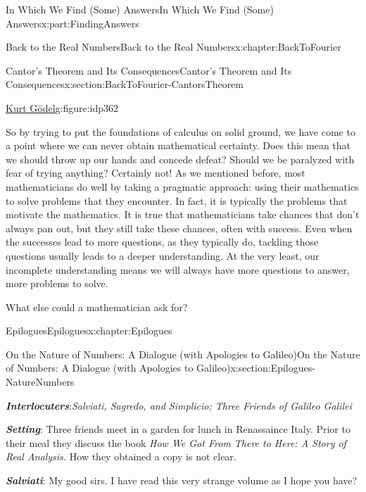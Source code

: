 \documentclass[oneside,10pt,]{book}
\newcommand{\alert}[1]{\textbf{\textit{#1}}}
\numberwithin{equation}{section}
\begin{document}
\begin{partptx}{In Which We Find (Some) Answers}{}{In Which We Find (Some) Answers}{}{}{x:part:FindingAnswers}
\begin{chapterptx}{Back to the Real Numbers}{}{Back to the Real Numbers}{}{}{x:chapter:BackToFourier}
\begin{sectionptx}{Cantor's Theorem and Its Consequences}{}{Cantor's Theorem and Its Consequences}{}{}{x:section:BackToFourier-CantorsTheorem}
\begin{figureptx}{\href{https://mathshistory.st-andrews.ac.uk/Biographies/Godel/}{Kurt Gödel}\protect\footnotemark{}}{g:figure:idp362}{}
\begin{image}{0.325}{0.35}{0.325}
\end{image}%
\tcblower
\end{figureptx}%
%
So by trying to put the foundations of calculus on solid ground, we have come to a point where we can never obtain mathematical certainty. Does this mean that we should throw up our hands and concede defeat? Should we be paralyzed with fear of trying anything? Certainly not! As we mentioned before, most mathematicians do well by taking a pragmatic approach: using their mathematics to solve problems that they encounter. In fact, it is typically the problems that motivate the mathematics. It is true that mathematicians take chances that don't always pan out, but they still take these chances, often with success. Even when the successes lead to more questions, as they typically do, tackling those questions usually leads to a deeper understanding. At the very least, our incomplete understanding means we will always have more questions to answer, more problems to solve.%
\par
What else could a mathematician ask for?%
\end{sectionptx}
\end{chapterptx}
%
\typeout{************************************************}
\typeout{************************************************}
%
\begin{chapterptx}{Epilogues}{}{Epilogues}{}{}{x:chapter:Epilogues}
%
%
\typeout{************************************************}
\typeout{************************************************}
%
\begin{sectionptx}{On the Nature of Numbers: A Dialogue (with Apologies to Galileo)}{}{On the Nature of Numbers: A Dialogue (with Apologies to Galileo)}{}{}{x:section:Epilogues-NatureNumbers}
\begin{introduction}{}%
\alert{Interlocuters}:\emph{Salviati, Sagredo, and Simplicio; Three Friends of Galileo Galilei}%
\par
\alert{Setting}: Three friends meet in a garden for lunch in Renassaince Italy.  Prior to their meal they discuss the book \emph{How We Got From There to Here: A Story of Real Analysis.} How they obtained a copy is not clear.%
\par
\alert{Salviati}: My good sirs. I have read this very strange volume as I hope you have?%
\par

\end{introduction}
\end{sectionptx}
\end{chapterptx}
\end{partptx}
\end{document}
